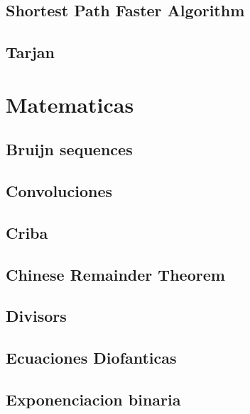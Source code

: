 \subsection{Shortest Path Faster Algorithm}
\raggedbottom
\hrulefill
\subsection{Tarjan}
\raggedbottom
\hrulefill

\section{Matematicas}
\subsection{Bruijn sequences}
\raggedbottom
\hrulefill
\subsection{Convoluciones}
\raggedbottom
\hrulefill
\subsection{Criba}
\raggedbottom
\hrulefill
\subsection{Chinese Remainder Theorem}
\raggedbottom
\hrulefill
\subsection{Divisors}
\raggedbottom
\hrulefill
\subsection{Ecuaciones Diofanticas}
\raggedbottom
\hrulefill
\subsection{Exponenciacion binaria}
\raggedbottom
\hrulefill
